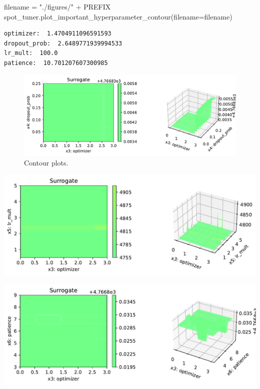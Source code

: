 \documentclass[
  letterpaper,
  DIV=11,
  numbers=noendperiod]{scrreprt}
\newenvironment{Shaded}{\begin{snugshade}}{\end{snugshade}}
\newcommand{\NormalTok}[1]{\textcolor[rgb]{0.00,0.23,0.31}{#1}}
\newcommand{\OperatorTok}[1]{\textcolor[rgb]{0.37,0.37,0.37}{#1}}
\newcommand{\StringTok}[1]{\textcolor[rgb]{0.13,0.47,0.30}{#1}}
\begin{document}
\begin{Shaded}
\begin{Highlighting}[]
\NormalTok{filename }\OperatorTok{=} \StringTok{"./figures/"} \OperatorTok{+}\NormalTok{ PREFIX}
\NormalTok{spot\_tuner.plot\_important\_hyperparameter\_contour(filename}\OperatorTok{=}\NormalTok{filename)}
\end{Highlighting}
\end{Shaded}

\begin{verbatim}
optimizer:  1.4704911096591593
dropout_prob:  2.6489771939994533
lr_mult:  100.0
patience:  10.701207607300985
\end{verbatim}

\begin{figure}[H]

{\centering \includegraphics{032_spot_lightning_rnn_diabetes_files/figure-pdf/cell-21-output-2.pdf}

}

\caption{Contour plots.}

\end{figure}%

\includegraphics{032_spot_lightning_rnn_diabetes_files/figure-pdf/cell-21-output-3.pdf}

\includegraphics{032_spot_lightning_rnn_diabetes_files/figure-pdf/cell-21-output-4.pdf}
\end{document}
